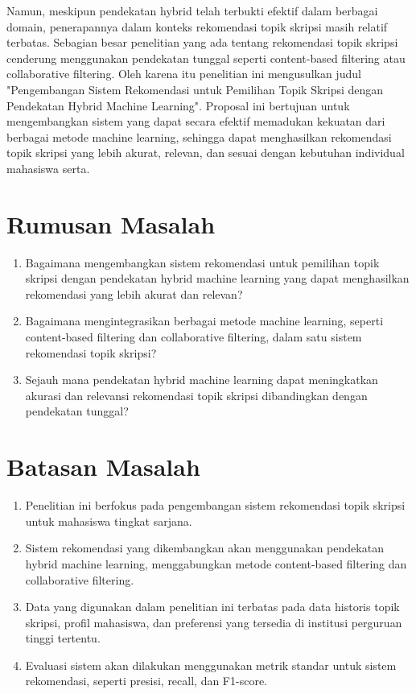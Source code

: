 Namun, meskipun pendekatan hybrid telah terbukti efektif dalam berbagai domain, penerapannya dalam konteks rekomendasi topik skripsi masih relatif terbatas. Sebagian besar penelitian yang ada tentang rekomendasi topik skripsi cenderung menggunakan pendekatan tunggal seperti content-based filtering atau collaborative filtering. Oleh karena itu penelitian ini mengusulkan judul "Pengembangan Sistem Rekomendasi  untuk Pemilihan Topik Skripsi dengan Pendekatan Hybrid Machine Learning".  Proposal ini bertujuan untuk mengembangkan sistem yang dapat secara efektif memadukan kekuatan dari berbagai metode machine learning, sehingga dapat menghasilkan rekomendasi topik skripsi yang lebih akurat, relevan, dan sesuai dengan kebutuhan individual mahasiswa serta. 

\section{Rumusan Masalah}
    \begin{enumerate}
        \item Bagaimana mengembangkan sistem rekomendasi untuk pemilihan topik skripsi dengan pendekatan hybrid machine learning yang dapat menghasilkan rekomendasi yang lebih akurat dan relevan?
        \item Bagaimana mengintegrasikan berbagai metode machine learning, seperti content-based filtering dan collaborative filtering, dalam satu sistem rekomendasi topik skripsi?
        \item Sejauh mana pendekatan hybrid machine learning dapat meningkatkan akurasi dan relevansi rekomendasi topik skripsi dibandingkan dengan pendekatan tunggal?
    \end{enumerate}

\section{Batasan Masalah}
    \begin{enumerate}
        \item Penelitian ini berfokus pada pengembangan sistem rekomendasi topik skripsi untuk mahasiswa tingkat sarjana.
        \item Sistem rekomendasi yang dikembangkan akan menggunakan pendekatan hybrid machine learning, menggabungkan metode content-based filtering dan collaborative filtering.
        \item Data yang digunakan dalam penelitian ini terbatas pada data historis topik skripsi, profil mahasiswa, dan preferensi yang tersedia di institusi perguruan tinggi tertentu.
        \item Evaluasi sistem akan dilakukan menggunakan metrik standar untuk sistem rekomendasi, seperti presisi, recall, dan F1-score.
    \end{enumerate}

